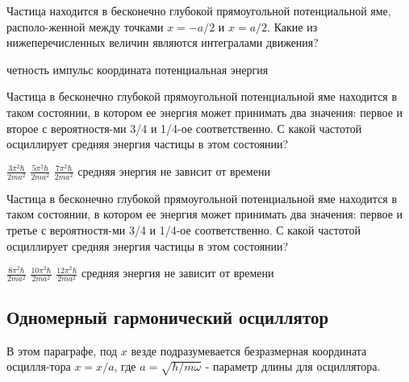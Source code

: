 \documentclass[11pt,a4paper]{exam}
\begin{document}
\begin{questions}
\question Частица находится в бесконечно глубокой прямоугольной потенциальной яме, располо-женной между точками $x =  - a/2$ и $x = a/2$. Какие из нижеперечисленных величин являются интегралами движения?
\begin{choices}
\choice четность    
\choice импульс     
\choice координата     
\choice потенциальная энергия
\end{choices}

\question Частица в бесконечно глубокой прямоугольной потенциальной яме находится в таком состоянии, в котором ее энергия может принимать два значения: первое и второе с вероятностя-ми 3/4 и 1/4-ое соответственно. С какой частотой осциллирует средняя энергия частицы в этом состоянии?
\begin{choices}
\choice $\frac{{3{\pi ^2}\hbar }}{{2m{a^2}}}$  
\choice $\frac{{5{\pi ^2}\hbar }}{{2m{a^2}}}$  
\choice $\frac{{7{\pi ^2}\hbar }}{{2m{a^2}}}$  
\choice средняя энергия не зависит от времени
\end{choices}

\question Частица в бесконечно глубокой прямоугольной потенциальной яме находится в таком состоянии, в котором ее энергия может принимать два значения: первое и третье с вероятностя-ми 3/4 и 1/4-ое соответственно. С какой частотой осциллирует средняя энергия частицы в этом состоянии?
\begin{choices}
\choice $\frac{{8{\pi ^2}\hbar }}{{2m{a^2}}}$  
\choice $\frac{{10{\pi ^2}\hbar }}{{2m{a^2}}}$ 
\choice $\frac{{12{\pi ^2}\hbar }}{{2m{a^2}}}$ 
\choice средняя энергия не зависит от времени
\end{choices}
\end{questions}




\subsection{ Одномерный гармонический осциллятор }
В этом параграфе, под $x$ везде подразумевается безразмерная координата осцилля-тора $x=x/a$, где $a=\sqrt{\hbar /m\omega }$ - параметр длины для осциллятора.
\end{document}
